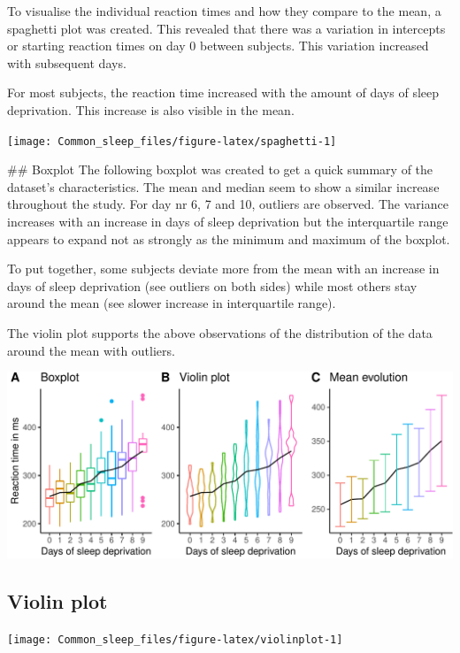\documentclass[
]{article}
\begin{document}
To visualise the individual reaction times and how they compare to the
mean, a spaghetti plot was created. This revealed that there was a
variation in intercepts or starting reaction times on day 0 between
subjects. This variation increased with subsequent days.

For most subjects, the reaction time increased with the amount of days
of sleep deprivation. This increase is also visible in the mean.

\begin{center}\texttt{[image: Common\_sleep\_files/figure-latex/spaghetti-1]} \end{center}

## Boxplot
The following boxplot was created to get a quick summary of the dataset's characteristics. The mean and median seem to show a similar increase throughout the study. For day nr 6, 7 and 10, outliers are observed. The variance increases with an increase in days of sleep deprivation but the interquartile range appears to expand not as strongly as the minimum and maximum of the boxplot. 

To put together, some subjects deviate more from the mean with an increase in days of sleep deprivation (see outliers on both sides)  while most others stay around the mean (see slower increase in interquartile range). 

The violin plot supports the above observations of the distribution of the data around the mean with outliers.


\begin{center}\includegraphics[width=0.8\linewidth]{Common_sleep_files/figure-latex/boxplot-1} \end{center}

\hypertarget{violin-plot}{%
\subsection{Violin plot}\label{violin-plot}}

\begin{center}\texttt{[image: Common\_sleep\_files/figure-latex/violinplot-1]} \end{center}
\end{document}

